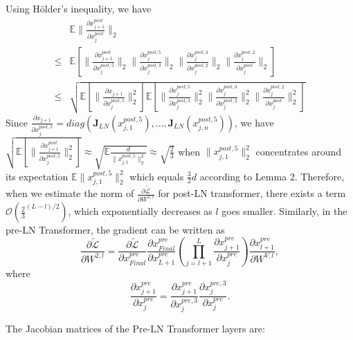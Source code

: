 \documentclass{article}
\begin{document}
Using H\"{o}lder's inequality, we have
\begin{align}
&\mathbb{E}\|\frac{\partial x_{j+1}^{post}}{\partial x_j^{post}}\|_2\nonumber\\
\leq&
\mathbb{E}\left[\|\frac{\partial x_{j+1}^{post}}{\partial x_j^{post,5}}\|_2\|\frac{\partial x_{j}^{post,5}}{\partial x_j^{post,3}}\|_2\|\frac{\partial x_{j}^{post,3}}{\partial x_j^{post,2}}\|_2\|\frac{\partial x_{j}^{post,2}}{\partial x_j^{post}}\|_2\right]\\
\leq&\sqrt{\mathbb{E}\left[\|\frac{\partial x_{j+1}}{\partial x_j^{post,5}}\|_2^2\right]\mathbb{E}\left[\|\frac{\partial x_{j}^{post,5}}{\partial x_j^{post,3}}\|_2^2\|\frac{\partial x_{j}^{post,3}}{\partial x_j^{post,2}}\|_2^2\|\frac{\partial x_{j}^{post,2}}{\partial x_j^{post}}\|_2^2\right]}
\end{align}
Since $\frac{\partial x_{j+1}}{\partial x_j^{post,5}}=diag(\mathbf{J}_{LN}(x_{j,1}^{post,5}),...,\mathbf{J}_{LN}(x_{j,n}^{post,5}))$, we have $\sqrt{\mathbb{E}\left[\|\frac{\partial x_{j+1}^{post}}{\partial x_j^{post,5}}\|_2^2\right]} \approx \sqrt{\mathbb{E}\frac{d}{\|x_{j,1}^{post,5}\|^2_2}} \approx \sqrt{\frac{2}{3}}$ when $\|x_{j,1}^{post,5}\|^2_2$ concentrates around its expectation $\mathbb{E}\|x_{j,1}^{post,5}\|^2_2$ which equals $\frac{3}{2}d$ according to Lemma 2. Therefore, when we estimate the norm of $\frac{\partial \tilde{\mathcal{L}}}{\partial W^{2,l}}$ for post-LN transformer, there exists a term $\mathcal{O}(\frac{2}{3}^{(L-l)/2})$, which exponentially decreases as $l$ goes smaller. Similarly, in the pre-LN Transformer, the gradient can be written as
$$\frac{\partial \tilde{\mathcal{L}}}{\partial W^{2,l}}=\frac{\partial \tilde{\mathcal{L}}}{\partial x^{pre}_{Final}}\frac{\partial x^{pre}_{Final}}{\partial x^{pre}_{L+1}}(\prod_{j=l+1}^{L}\frac{\partial x^{pre}_{j+1}}{\partial x^{pre}_j})\frac{\partial x^{pre}_{l+1}}{\partial W^{V,l}},$$ where $$ \frac{\partial x^{pre}_{j+1}}{\partial x^{pre}_j}=
\frac{\partial x^{pre}_{j+1}}{\partial x_j^{pre,3}}\frac{\partial x_{j}^{pre,3}}{\partial x_j^{pre}}.
$$ 

The Jacobian matrices of the Pre-LN Transformer layers are:
\end{document}
